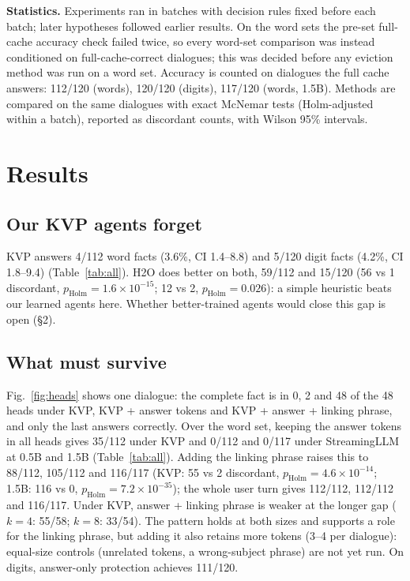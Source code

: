\documentclass[11pt,a4paper]{article}
\newcommand{\ph}{p_\text{Holm}}
\begin{document}
\textbf{Statistics.} Experiments ran in batches with decision rules fixed before each batch; later hypotheses followed earlier results. On the word sets the pre-set full-cache accuracy check failed twice, so every word-set comparison was instead conditioned on full-cache-correct dialogues; this was decided before any eviction method was run on a word set. Accuracy is counted on dialogues the full cache answers: 112/120 (words), 120/120 (digits), 117/120 (words, 1.5B). Methods are compared on the same dialogues with exact McNemar tests (Holm-adjusted within a batch), reported as discordant counts, with Wilson 95\% intervals.

\section{Results}

\subsection{Our KVP agents forget}\label{sec:forgets}
KVP answers 4/112 word facts (3.6\%, CI 1.4--8.8) and 5/120 digit facts (4.2\%, CI 1.8--9.4) (Table~\ref{tab:all}). H2O does better on both, 59/112 and 15/120 (56 vs 1 discordant, $\ph = 1.6\times10^{-15}$; 12 vs 2, $\ph = 0.026$): a simple heuristic beats our learned agents here. Whether better-trained agents would close this gap is open (\S2).

\subsection{What must survive}\label{sec:survive}
Fig.~\ref{fig:heads} shows one dialogue: the complete fact is in 0, 2 and 48 of the 48 heads under KVP, KVP + answer tokens and KVP + answer + linking phrase, and only the last answers correctly. Over the word set, keeping the answer tokens in all heads gives 35/112 under KVP and 0/112 and 0/117 under StreamingLLM at 0.5B and 1.5B (Table~\ref{tab:all}). Adding the linking phrase raises this to 88/112, 105/112 and 116/117 (KVP: 55 vs 2 discordant, $\ph = 4.6\times10^{-14}$; 1.5B: 116 vs 0, $\ph = 7.2\times10^{-35}$); the whole user turn gives 112/112, 112/112 and 116/117. Under KVP, answer + linking phrase is weaker at the longer gap ($k = 4$: 55/58; $k = 8$: 33/54). The pattern holds at both sizes and supports a role for the linking phrase, but adding it also retains more tokens (3--4 per dialogue): equal-size controls (unrelated tokens, a wrong-subject phrase) are not yet run. On digits, answer-only protection achieves 111/120.
\end{document}

